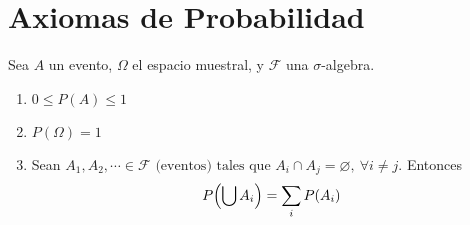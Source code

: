 

\section{Axiomas de Probabilidad}

Sea $A$ un evento, $\Omega$ el espacio muestral, y $\mathcal F$ una $\sigma$-algebra.

\begin{enumerate}
  \item $0 \le P(A) \le 1$
  \item $P(\Omega) = 1$
  \item Sean $A_1, A_2, \cdots \in \mathcal F \text{ (eventos) tales que } A_i \cap A_j = \varnothing, ~\forall i \neq j.$ Entonces $$P\parens*{\bigcup A_i} = \sum_i P(A_i)$$
\end{enumerate}
